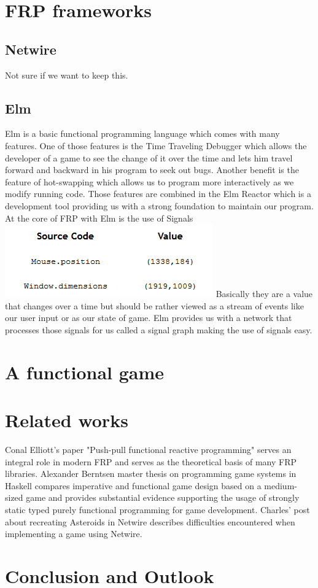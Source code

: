 \documentclass[pdftex,a4paper]{extarticle}
\begin{document}
\section{FRP frameworks}
\label{sec:frameworks}
\subsection{Netwire}
Not sure if we want to keep this.
\subsection{Elm}
Elm is a basic functional programming language which comes with many features.
One of those features is the Time Traveling Debugger\cite{elm-debugger} which allows the developer of a game to see the change of it over the time and lets him travel forward and backward in his program to seek out bugs.
Another benefit is the feature of hot-swapping\cite{elm-swapping} which allows us to program more interactively as we modify running code.
Those features are combined in the Elm Reactor\cite{elm-reactor} which is a development tool providing us with a strong foundation to maintain our program.
At the core of FRP with Elm is the use of Signals\cite{elm-signal}
\newline
\includegraphics{Signals}
\newline
Basically they are a value that changes over a time but should be rather viewed as a stream of events like our user input or as our state of game.
Elm provides us with a network that processes those signals for us called a signal graph making the use of signals easy.
\cite{elm-examples}

\section{A functional game}
\label{sec:game}

\section{Related works}
\label{sec:related}
Conal Elliott's paper "Push-pull functional reactive programming" \cite{Elliott2009-push-pull-frp} serves an integral role in modern FRP
and serves as the theoretical basis of many FRP libraries. Alexander Berntsen master thesis on programming game systems in Haskell \cite{Berntsen2014-game-systems-haskell} compares imperative and functional game design based on a medium-sized game and provides substantial evidence supporting the usage of strongly static typed purely functional programming for game development. Charles' post about recreating Asteroids in Netwire \cite{asteroids} describes difficulties encountered when implementing a game using Netwire.
\section{Conclusion and Outlook}
\label{sec:conclusion}



\end{document}
